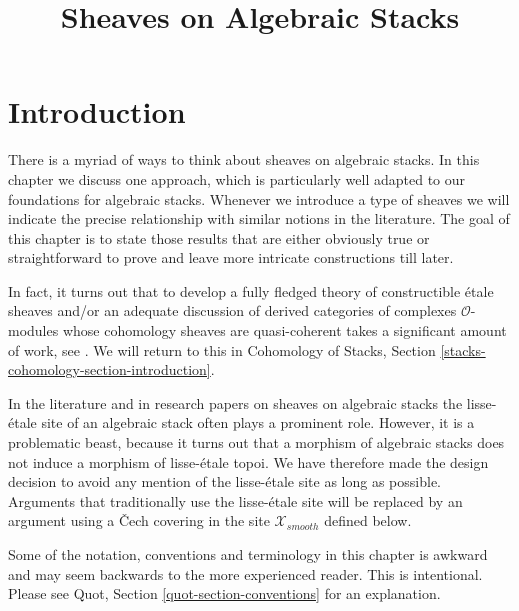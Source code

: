 

%


\title{Sheaves on Algebraic Stacks}


\maketitle

\label{section-phantom}

\tableofcontents

\section{Introduction}
\label{section-introduction}

\noindent
There is a myriad of ways to think about sheaves on algebraic stacks.
In this chapter we discuss one approach, which is particularly well
adapted to our foundations for algebraic stacks. Whenever we introduce
a type of sheaves we will indicate the precise relationship with
similar notions in the literature.
The goal of this chapter is to state those results
that are either obviously true or straightforward to prove
and leave more intricate constructions till later.

\medskip\noindent
In fact, it turns out that to develop a fully fledged theory of
constructible \'etale sheaves and/or an adequate discussion of
derived categories of complexes $\mathcal{O}$-modules whose
cohomology sheaves are quasi-coherent takes a significant amount of work, see
\cite{olsson_sheaves}. We will return to this in
Cohomology of Stacks, Section \ref{stacks-cohomology-section-introduction}.

\medskip\noindent
In the literature and in research papers on sheaves on algebraic stacks
the lisse-\'etale site of an algebraic stack often plays a prominent role.
However, it is a problematic beast, because it turns out that a morphism of
algebraic stacks does not induce a morphism of lisse-\'etale topoi. We have
therefore made the design decision to avoid any mention of the lisse-\'etale
site as long as possible. Arguments that traditionally use the lisse-\'etale
site will be replaced by an argument using a {\v C}ech covering
in the site $\mathcal{X}_{smooth}$ defined below.

\medskip\noindent
Some of the notation, conventions and terminology in this chapter is awkward
and may seem backwards to the more experienced reader. This is intentional.
Please see Quot, Section \ref{quot-section-conventions} for an
explanation.




